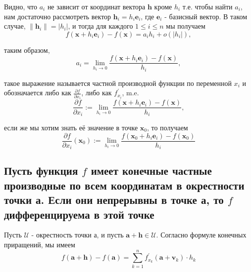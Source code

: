 \documentclass[a4paper]{article}
\begin{document}
Видно, что $a_i$ не зависит от координат вектора $\mathbf{h}$ кроме $h_i$ т.е. чтобы найти $a_i$, нам достаточно рассмотреть вектор $\mathbf{h}_i=h_i \mathbf{e}_i$, где $\mathbf{e}_i$ - базисный вектор. В таком случае, $\left\|\mathbf{h}_i\right\|=\left|h_i\right|$, и тогда для каждого $1 \leq i \leq n$ мы получаем
$$
f\left(\mathbf{x}+h_i \mathbf{e}_i\right)-f(\mathbf{x})=a_i h_i+o\left(\left|h_i\right|\right),
$$

таким образом,
$$
a_i=\lim _{h_i \rightarrow 0} \frac{f\left(\mathbf{x}+h_i \mathbf{e}_i\right)-f(\mathbf{x})}{h_i},
$$

такое выражение называется частной производной функции по переменной $x_i$ и обозначается либо как $\frac{\partial f}{\partial x_i}$, либо как $f_{x_i}^{\prime}$, m.e.
$$
\frac{\partial f}{\partial x_i}:=\lim _{h_i \rightarrow 0} \frac{f\left(\mathbf{x}+h_i \mathbf{e}_i\right)-f(\mathbf{x})}{h_i},
$$

если же мы хотим знать её значение в точке $\mathbf{x}_0$, то получаем
$$
\frac{\partial f}{\partial x_i}\left(\mathbf{x}_0\right):=\lim _{h_i \rightarrow 0} \frac{f\left(\mathbf{x}_0+h_i \mathbf{e}_i\right)-f\left(\mathbf{x}_0\right)}{h_i}
$$

\subsection{Пусть функция $f$ имеет конечные частные производные по всем координатам в окрестности точки а. Если они непрерывны в точке а, то $f$ дифференцируема в этой точке}

Пусть $\mathscr{U}$ - окрестность точки а, и пусть $\mathbf{a}+\mathbf{h} \in \mathscr{U}$. Согласно формуле конечных приращений, мы имеем
$$
f(\mathbf{a}+\mathbf{h})-f(\mathbf{a})=\sum_{k=1}^n f_{x_k}^{\prime}\left(\mathbf{a}+\mathbf{v}_k\right) \cdot h_k
$$
\end{document}
